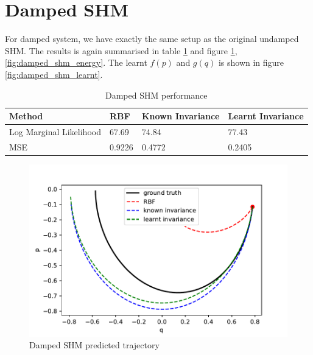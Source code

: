 \documentclass{statsmsc}
\begin{document}
\section{Damped SHM}
For damped system, we have exactly the same setup as the original undamped SHM.
The results is again summarised in table \ref{tab:damped_shm_performance} and figure \ref{fig:damped_shm_prediction}, \ref{fig:damped_shm_energy}.
The learnt $f(p)$ and $g(q)$ is shown in figure \ref{fig:damped_shm_learnt}.

\begin{table}[H]
  \centering
  \begin{tabular}{l l l l}
    \hline
Method           & RBF & Known Invariance&  Learnt Invariance\\
  \hline
    Log Marginal Likelihood & 67.69 & 74.84 & 77.43  \\
MSE & 0.9226 & 0.4772 & 0.2405 \\
    \hline
  \end{tabular}
  \caption{Damped SHM performance}
  \label{tab:damped_shm_performance}
\end{table}

\begin{figure}[H]
        \centering
        \includegraphics[width=\linewidth]{../codes/figures/damped_shm_predicted.pdf}
        \caption{Damped SHM predicted trajectory}
        \label{fig:damped_shm_prediction}
\end{figure}
\end{document}
